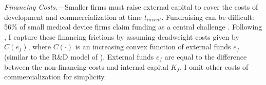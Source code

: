\documentclass[letterpaper,12pt]{article}
\theoremstyle{definition}
\begin{document}
\textit{Financing Costs.}---Smaller firms must raise external capital to cover the costs of development and commercialization at time $t_{invent}$.\footnotemark {} Fundraising can be difficult: 56\% of small medical device firms claim funding as a central challenge \citep{emergo_2019}.
Following \citet{stein2003agency}, I capture these financing frictions by assuming deadweight costs given by $C(e_f)$, where $C(\cdot)$ is an increasing convex function of external funds $e_f$ (similar to the R\&D model of \citealp{stern2017innovation}).
External funds $e_f$ are equal to the difference between the non-financing costs and internal capital $K_f$. I omit other costs of commercialization for simplicity.







\vspace{10pt}
\end{document}
